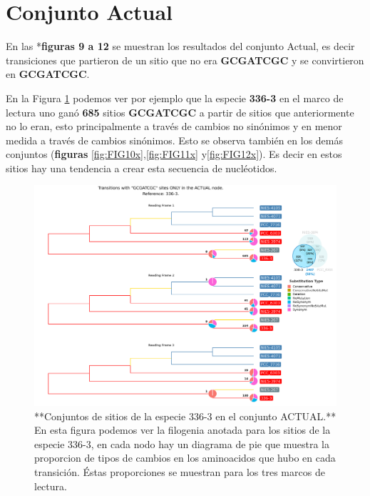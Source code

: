 \documentclass[
]{book}
\begin{document}
\hypertarget{conjunto-actual}{%
\section{Conjunto Actual}\label{conjunto-actual}}

En las *\textbf{figuras 9 a 12} se muestran los resultados del conjunto Actual, es decir transiciones que partieron de un sitio que no era \textbf{GCGATCGC} y se convirtieron en \textbf{GCGATCGC}.

En la Figura \ref{fig:FIG9x} podemos ver por ejemplo que la especie \textbf{336-3} en el marco de lectura uno ganó \textbf{685} sitios \textbf{GCGATCGC} a partir de sitios que anteriormente no lo eran, esto principalmente a través de cambios no sinónimos y en menor medida a través de cambios sinónimos. Esto se observa también en los demás conjuntos (\textbf{figuras} \ref{fig:FIG10x},\ref{fig:FIG11x} y\ref{fig:FIG12x}). Es decir en estos sitios hay una tendencia a crear esta secuencia de nucléotidos.

\begin{figure}

{\centering \includegraphics[width=1.2\linewidth]{Clados/Calothrix_B/figures/A/GCGATCGC/Actual/336-3_Actual_A_tree} 

}

\caption{**Conjuntos de sitios de la especie 336-3 en el conjunto ACTUAL.** En esta figura podemos ver la filogenia anotada para los sitios de la especie 336-3, en cada nodo hay un diagrama de pie que muestra la proporcion de tipos de cambios en los aminoacidos que hubo en cada transición. Éstas proporciones se muestran para los tres marcos de lectura.}\label{fig:FIG9x}
\end{figure}
\end{document}
